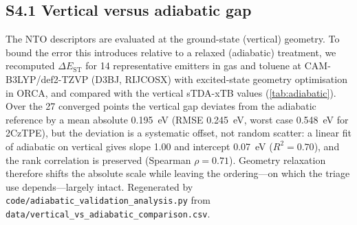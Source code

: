 \documentclass[twoside,twocolumn,9pt]{extarticle}
\begin{document}
\subsection*{S4.1 Vertical versus adiabatic gap}
The NTO descriptors are evaluated at the ground-state (vertical) geometry. To bound
the error this introduces relative to a relaxed (adiabatic) treatment, we recomputed
$\Delta E_\text{ST}$ for \num{14} representative emitters in gas and toluene at
CAM-B3LYP/def2-TZVP (D3BJ, RIJCOSX) with excited-state geometry optimisation in
ORCA, and compared with the vertical sTDA-xTB values (\cref{tab:adiabatic}). Over the
\num{27} converged points the vertical gap deviates from the adiabatic reference by a
mean absolute \qty{0.195}{\electronvolt} (RMSE \qty{0.245}{\electronvolt}, worst case
\qty{0.548}{\electronvolt} for 2CzTPE), but the deviation is a systematic offset, not
random scatter: a linear fit of adiabatic on vertical gives slope \num{1.00} and
intercept \qty{0.07}{\electronvolt} ($R^2 = 0.70$), and the rank correlation is
preserved (Spearman $\rho = 0.71$). Geometry relaxation therefore shifts the absolute
scale while leaving the ordering---on which the triage use depends---largely intact.
Regenerated by \texttt{code/adiabatic\_validation\_analysis.py} from
\texttt{data/vertical\_vs\_adiabatic\_comparison.csv}.
\end{document}
